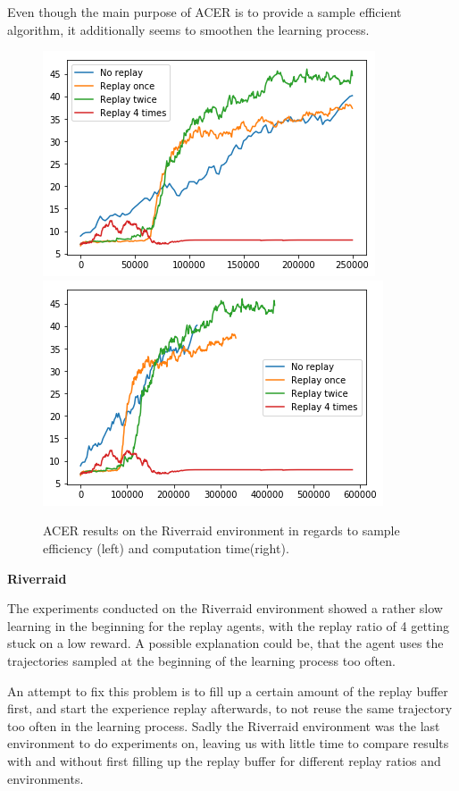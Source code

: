 Even though the main purpose of ACER is to provide a sample efficient algorithm, it additionally seems to smoothen the learning process.
\begin{figure}[h]
\includegraphics[scale=0.55]{bilder/riverraidbyonline.png}
\includegraphics[scale=0.55]{bilder/riverraidbytime.png}
\caption{ACER results on the Riverraid environment in regards to sample efficiency (left) and computation time(right).}

\end{figure}

\textbf{Riverraid}

The experiments conducted on the Riverraid environment showed a rather slow learning in the beginning for the replay agents, with the replay ratio of 4 getting stuck on a low reward. A possible explanation could be, that the agent uses the trajectories sampled at the beginning of the learning process too often.

An attempt to fix this problem is to fill up a certain amount of the replay buffer first, and start the experience replay afterwards, to not reuse the same trajectory too often in the learning process. Sadly the Riverraid environment was the last environment to do experiments on, leaving us with little time to compare results with and without first filling up the replay buffer for different replay ratios and environments.


